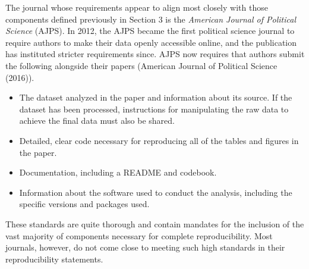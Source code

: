 \documentclass[12pt,twoside]{reedthesis}
\providecommand{\tightlist}{%
  \setlength{\itemsep}{0pt}\setlength{\parskip}{0pt}}
\begin{document}
The journal whose requirements appear to align most closely with those components defined previously in Section 3 is the \emph{American Journal of Political Science} (AJPS). In 2012, the AJPS became the first political science journal to require authors to make their data openly accessible online, and the publication has instituted stricter requirements since. AJPS now requires that authors submit the following alongside their papers (American Journal of Political Science (2016)).
\begin{itemize}
\tightlist
\item
  The dataset analyzed in the paper and information about its source. If the dataset has been processed, instructions for manipulating the raw data to achieve the final data must also be shared.
\item
  Detailed, clear code necessary for reproducing all of the tables and figures in the paper.
\item
  Documentation, including a README and codebook.
\item
  Information about the software used to conduct the analysis, including the specific versions and packages used.
\end{itemize}
These standards are quite thorough and contain mandates for the inclusion of the vast majority of components necessary for complete reproducibility. Most journals, however, do not come close to meeting such high standards in their reproducibility statements.
\end{document}
